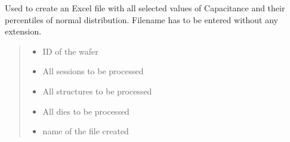\documentclass[letterpaper,10pt,english]{sphinxmanual}
\begin{document}

\begin{fulllineitems}
\label{\detokenize{excel:excel.excel_normal_C}}
\pysigstartsignatures
{}
\pysigstopsignatures
\sphinxAtStartPar
Used to create an Excel file with all selected values of Capacitance and their percentiles of normal distribution.
Filename has to be entered without any extension.
\begin{quote}\begin{description}
\begin{itemize}
\item {} 
\sphinxAtStartPar
{} \textendash{} ID of the wafer

\item {} 
\sphinxAtStartPar
{} \textendash{} All sessions to be processed

\item {} 
\sphinxAtStartPar
{} \textendash{} All structures to be processed

\item {} 
\sphinxAtStartPar
{} \textendash{} All dies to be processed

\item {} 
\sphinxAtStartPar
{} \textendash{} name of the file created

\end{itemize}

\end{description}\end{quote}

\end{fulllineitems}

\end{document}
